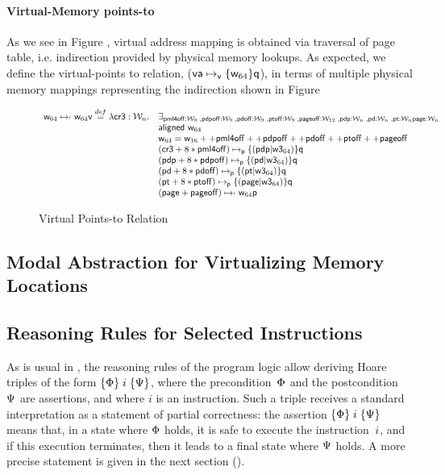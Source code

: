 \paragraph{Virtual-Memory points-to} As we see in Figure , virtual address mapping is obtained via traversal of page table, i.e. indirection provided by physical memory lookups. As expected, we define the virtual-points to relation, ($\mathsf{va}\mapsto_{\mathsf{v}}\{\mathsf{w}_{64}\}\mathsf{q}$), in terms of multiple physical memory mappings representing the indirection shown in Figure 
\begin{figure*}
\[
\begin{array}{cl}
  \mathsf{w}_{64}\mapsto_{'}\mathsf{w}_{64}\mathsf{v} \stackrel{def}{=} \lambda \mathsf{cr3}:\mathcal{W}_n.
  & \exists_{\mathsf{pml4off}:\mathcal{W}_{9} \;, \mathsf{pdpoff}:\mathcal{W}_{9} \;, \mathsf{pdoff}:\mathcal{W}_{9} \;, \mathsf{ptoff}:\mathcal{W}_{9} \;, \mathsf{pageoff}:\mathcal{W}_{12} \;, \mathsf{pdp}:\mathcal{W}_n \;, \mathsf{pd}:\mathcal{W}_n \;, \mathsf{pt}:\mathcal{W}_n \mathsf{page}:\mathcal{W}_n}\\
  & \textsf{aligned } \mathsf{w}_{64} \\
  & \mathsf{w}_{64} = \mathsf{w}_{16} ++ \mathsf{pml4off} ++ \mathsf{pdpoff} ++ \mathsf{pdoff} ++ \mathsf{ptoff} ++ \mathsf{pageoff} \\
  &  (\mathsf{cr3}+8*\mathsf{pml4off})\mapsto_{\mathsf{p}}\{(\mathsf{pdp} | \mathsf{w3}_{64})\}\mathsf{q} \\
  &  (\mathsf{pdp}+8*\mathsf{pdpoff})\mapsto_{\mathsf{p}}\{(\mathsf{pd} | \mathsf{w3}_{64})\}\mathsf{q} \\
  & (\mathsf{pd}+8*\mathsf{pdoff})\mapsto_{\mathsf{p}}\{(\mathsf{pt} | \mathsf{w3}_{64})\}\mathsf{q} \\
  & (\mathsf{pt}+8*\mathsf{ptoff})\mapsto_{\mathsf{p}}\{(\mathsf{page} | \mathsf{w3}_{64})\}\mathsf{q} \\
  & (\mathsf{page}+\mathsf{pageoff})\mapsto_{'}\mathsf{w}_{64}\mathsf{p} \\

\end{array}
\]
\caption{Virtual Points-to Relation}
  \label{fig:virtualpointsto}
\end{figure*}

\subsection{Modal Abstraction for Virtualizing Memory Locations}
\label{sec:modallocationvirtualization}


\subsection{Reasoning Rules for Selected Instructions}
\label{sec:reasoning}

As is usual in \SL, the reasoning rules of the program logic allow deriving
Hoare triples of the form $\{\Phi\}\;i\;\{\Psi\}$, where the
precondition~$\Phi$ and the postcondition~$\Psi$ are assertions,
and where $i$ is an instruction.
Such a triple receives a standard interpretation as a statement of partial
correctness: the assertion $\{\Phi\}\;i\;\{\Psi\}$ means that, in a state
where $\Phi$ holds, it is safe to execute the instruction~$i$, and if
this execution terminates, then it leads to a final state where $\Psi$ holds.
A more precise statement is given in the next section ().

